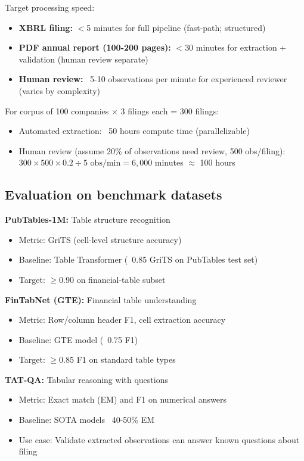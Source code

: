 Target processing speed:
\begin{itemize}
\item \textbf{XBRL filing:} $<$5 minutes for full pipeline (fast-path; structured)
\item \textbf{PDF annual report (100-200 pages):} $<$30 minutes for extraction +
  validation (human review separate)
\item \textbf{Human review:} ~5-10 observations per minute for experienced reviewer
  (varies by complexity)
\end{itemize}

For corpus of 100 companies $\times$ 3 filings each = 300 filings:
\begin{itemize}
\item Automated extraction: ~50 hours compute time (parallelizable)
\item Human review (assume 20\% of observations need review, 500 obs/filing):
  $300 \times 500 \times 0.2 \div 5 \text{ obs/min} = 6{,}000$ minutes $\approx$ 100 hours
\end{itemize}

\subsection{Evaluation on benchmark datasets}

\textbf{PubTables-1M:} Table structure recognition
\begin{itemize}
\item Metric: GriTS (cell-level structure accuracy)
\item Baseline: Table Transformer (~0.85 GriTS on PubTables test set)
\item Target: $\geq$0.90 on financial-table subset
\end{itemize}

\textbf{FinTabNet (GTE):} Financial table understanding
\begin{itemize}
\item Metric: Row/column header F1, cell extraction accuracy
\item Baseline: GTE model (~0.75 F1)
\item Target: $\geq$0.85 F1 on standard table types
\end{itemize}

\textbf{TAT-QA:} Tabular reasoning with questions
\begin{itemize}
\item Metric: Exact match (EM) and F1 on numerical answers
\item Baseline: SOTA models ~40-50\% EM
\item Use case: Validate extracted observations can answer known questions about filing
\end{itemize}

